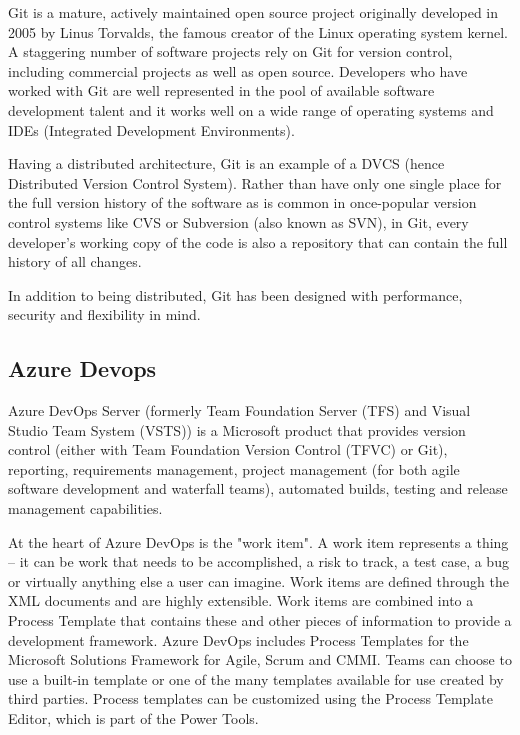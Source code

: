 \documentclass[10pt,oneside,a4paper]{article}
\begin{document}
Git is a mature, actively maintained open source project originally developed in 2005 by Linus Torvalds, the famous creator of the Linux operating system kernel. A staggering number of software projects rely on Git for version control, including commercial projects as well as open source. Developers who have worked with Git are well represented in the pool of available software development talent and it works well on a wide range of operating systems and IDEs (Integrated Development Environments).\cite{Git}

Having a distributed architecture, Git is an example of a DVCS (hence Distributed Version Control System). Rather than have only one single place for the full version history of the software as is common in once-popular version control systems like CVS or Subversion (also known as SVN), in Git, every developer's working copy of the code is also a repository that can contain the full history of all changes.

In addition to being distributed, Git has been designed with performance, security and flexibility in mind.\cite{Version} 

\subsection*{Azure Devops}

Azure DevOps Server (formerly Team Foundation Server (TFS) and Visual Studio Team System (VSTS)) is a Microsoft product that provides version control (either with Team Foundation Version Control (TFVC) or Git), reporting, requirements management, project management (for both agile software development and waterfall teams), automated builds, testing and release management capabilities.\cite{Azure} 

At the heart of Azure DevOps is the "work item". A work item represents a thing – it can be work that needs to be accomplished, a risk to track, a test case, a bug or virtually anything else a user can imagine. Work items are defined through the XML documents and are highly extensible. Work items are combined into a Process Template that contains these and other pieces of information to provide a development framework. Azure DevOps includes Process Templates for the Microsoft Solutions Framework for Agile, Scrum and CMMI. Teams can choose to use a built-in template or one of the many templates available for use created by third parties. Process templates can be customized using the Process Template Editor, which is part of the Power Tools.
\end{document}
